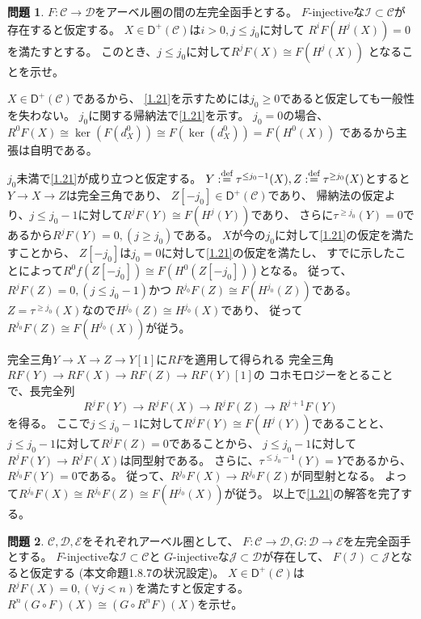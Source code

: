 \documentclass[uplatex,dvipdfmx]{jsarticle}
\makeatletter
\theoremstyle{definition}
\newtheorem{prob}[prob]{問題}
\renewenvironment{proof}[1][\proofname]{
  \pushQED{\qed}%
  \normalfont \topsep6\p@\@plus6\p@\relax
  \trivlist
  \item[\hskip\labelsep
    #1\@addpunct{\textbf{.}}]\ignorespaces
}{%
  \popQED\endtrivlist\@endpefalse
}
\providecommand{\proofname}{証明}
\newcommand{\sfD}{\mathsf{D}}
\newcommand\mcC{\mathcal{C}}
\newcommand\mcD{\mathcal{D}}
\newcommand\mcE{\mathcal{E}}
\newcommand\mcI{\mathcal{I}}
\newcommand\mcJ{\mathcal{J}}
\def\dfn{:\overset{\mbox{{\scriptsize def}}}{=}}
\makeatother
\begin{document}
\begin{prob}\label{1.21}
  \(F:\mcC\to\mcD\)をアーベル圏の間の左完全函手とする。
  \(F\)-injectiveな\(\mcI\subset \mcC\)が存在すると仮定する。
  \(X\in \sfD^+(\mcC)\)は\(i>0,j\leq j_0\)に対して
  \(R^iF(H^j(X)) = 0\)を満たすとする。
  このとき、\(j\leq j_0\)に対して\(R^jF(X) \cong F(H^j(X))\)
  となることを示せ。
\end{prob}

\begin{proof}
  \(X\in \sfD^+(\mcC)\)であるから、
  \autoref{1.21}を示すためには\(j_0 \geq 0\)であると仮定しても一般性を失わない。
  \(j_0\)に関する帰納法で\autoref{1.21}を示す。
  \(j_0=0\)の場合、
  \(R^0F(X)\cong \ker(F(d_X^0)) \cong F(\ker(d_X^0)) = F(H^0(X))\)
  であるから主張は自明である。

  \(j_0\)未満で\autoref{1.21}が成り立つと仮定する。
  \(Y\dfn \tau^{\leq j_0-1}(X), Z\dfn \tau^{\geq j_0}(X)\)とすると
  \(Y\to X\to Z\)は完全三角であり、
  \(Z[-j_0]\in \sfD^+(\mcC)\)であり、
  帰納法の仮定より、\(j\leq j_0-1\)に対して\(R^jF(Y) \cong F(H^j(Y))\)であり、
  さらに\(\tau^{\geq j_0}(Y) = 0\)であるから\(R^jF(Y) = 0, (j\geq j_0)\)である。
  \(X\)が今の\(j_0\)に対して\autoref{1.21}の仮定を満たすことから、
  \(Z[-j_0]\)は\(j_0=0\)に対して\autoref{1.21}の仮定を満たし、
  すでに示したことによって\(R^0f(Z[-j_0])\cong F(H^0(Z[-j_0]))\)となる。
  従って、\(R^jF(Z) = 0, (j \leq j_0-1)\)かつ
  \(R^{j_0}F(Z) \cong F(H^{j_0}(Z))\)である。
  \(Z = \tau^{\geq j_0}(X)\)なので\(H^{j_0}(Z) \cong H^{j_0}(X)\)であり、
  従って\(R^{j_0}F(Z) \cong F(H^{j_0}(X))\)が従う。

  完全三角\(Y\to X\to Z\to Y[1]\)に\(RF\)を適用して得られる
  完全三角\(RF(Y) \to RF(X) \to RF(Z)\to RF(Y)[1]\)の
  コホモロジーをとることで、長完全列
  \[
  R^jF(Y) \to R^jF(X) \to R^jF(Z) \to R^{j+1}F(Y)
  \]
  を得る。
  ここで\(j\leq j_0-1\)に対して\(R^jF(Y) \cong F(H^j(Y))\)であることと、
  \(j\leq j_0-1\)に対して\(R^jF(Z) = 0\)であることから、
  \(j\leq j_0-1\)に対して\(R^jF(Y)\to R^jF(X)\)は同型射である。
  さらに、\(\tau^{\leq j_0-1}(Y) = Y\)であるから、
  \(R^{j_0}F(Y) = 0\)である。
  従って、\(R^{j_0}F(X)\to R^{j_0}F(Z)\)が同型射となる。
  よって\(R^{j_0}F(X)\cong R^{j_0}F(Z) \cong F(H^{j_0}(X))\)が従う。
  以上で\autoref{1.21}の解答を完了する。
\end{proof}








\begin{prob}\label{1.22}
  \(\mcC,\mcD,\mcE\)をそれぞれアーベル圏として、
  \(F:\mcC\to \mcD, G:\mcD\to \mcE\)を左完全函手とする。
  \(F\)-injectiveな\(\mcI\subset \mcC\)と
  \(G\)-injectiveな\(\mcJ\subset \mcD\)が存在して、
  \(F(\mcI)\subset \mcJ\)となると仮定する (本文命題1.8.7の状況設定)。
  \(X\in \sfD^+(\mcC)\)は\(R^jF(X) = 0, (\forall j<n)\)を満たすと仮定する。
  \(R^n(G\circ F)(X) \cong (G\circ R^nF)(X)\)を示せ。
\end{prob}
\end{document}
